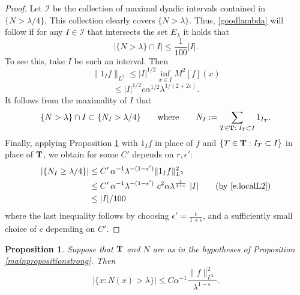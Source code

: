 \documentclass[12pt]{amsart}
\numberwithin{equation}{section}
\def\T{{\bf T}}
\newcommand {\calI}{\mathcal{I}}
\newtheorem{proposition}[theorem]{Proposition}
\begin{document}
\begin{proof}
Let $\calI$ be the collection of maximal dyadic intervals contained in $\{N > \lambda/4\}$. This collection clearly covers $\{N > \lambda\}$. Thus, \eqref{goodlambda} will follow if for any $I \in \calI$ that intersects the set $E_\lambda$ it holds that 
\[
|\{N > \lambda \} \cap I| \leq \frac{1}{100}|I|.
\]
To see this, take $I$ be such an interval. Then
\[
\|1_I f\|_{L^2} \le |I|^{1/2} \inf_{x\in I} M^2[f](x)
\]
\begin{equation}\label{e.localL2} 
\leq |I|^{1/2} c \alpha^{1/2} \lambda^{1/(2 + 2\epsilon)}.
\end{equation}
It follows from the maximality of $I$ that
\[
\{N > \lambda\} \cap I \subset \{N_I > \lambda/4\} \qquad \text{where} \qquad N_I := \sum_{T \in \T: \, \, I_T \subset I} 1_{I_T} .
\]
Finally, applying Proposition \ref{mainpropositionweak} with $1_If$ in place of $f$ and $\{T \in \T : I_T \subset I\}$ in place of $\T$, we obtain for some $C'$ depends on $r,\epsilon'$:
\begin{align*}
|\{N_I \geq \lambda/4\}| & \leq C' \, \alpha^{-1} \lambda^{-(1-\epsilon')} \|1_If\|_{L^2}^2 \\
&\leq C' \, \alpha^{-1} \lambda^{-(1-\epsilon')} \,\, c^2 \alpha \lambda^{\frac{1}{1 + \epsilon}}  \,\, |I| \qquad \text{(by \eqref{e.localL2})} \\
&\leq |I|/100
\end{align*}
where the last inequality follows by choosing $\epsilon' = \frac{\epsilon}{1 + \epsilon}$, and a sufficiently small choice of $c$ depending on $C'$.
\end{proof}

\begin{proposition} \label{mainpropositionweak} 
Suppose that $\T$ and $N$ are as in the hypotheses of Proposition \ref{mainpropositionstrong}. 
Then
\begin{equation} \label{mainpropconc}
|\{x : N(x) > \lambda\}| \leq C \alpha^{-1} \frac{\|f\|^2_{L^2}}{\lambda^{1 - \epsilon}}.
\end{equation}
\end{proposition}
\end{document}
